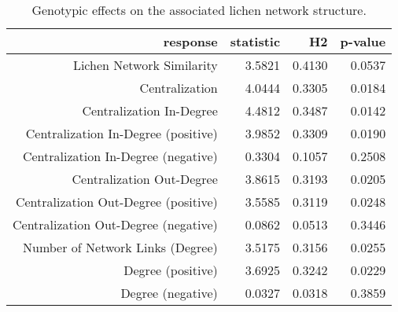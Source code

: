 \begin{table}[ht]
\centering
\begin{tabular}{rrrr}
  \hline
response & statistic & H2 & p-value \\ 
  \hline
Lichen Network Similarity & 3.5821 & 0.4130 & 0.0537 \\ 
  Centralization & 4.0444 & 0.3305 & 0.0184 \\ 
  Centralization In-Degree & 4.4812 & 0.3487 & 0.0142 \\ 
  Centralization In-Degree (positive) & 3.9852 & 0.3309 & 0.0190 \\ 
  Centralization In-Degree (negative) & 0.3304 & 0.1057 & 0.2508 \\ 
  Centralization Out-Degree & 3.8615 & 0.3193 & 0.0205 \\ 
  Centralization Out-Degree (positive) & 3.5585 & 0.3119 & 0.0248 \\ 
  Centralization Out-Degree (negative) & 0.0862 & 0.0513 & 0.3446 \\ 
  Number of Network Links (Degree) & 3.5175 & 0.3156 & 0.0255 \\ 
  Degree (positive) & 3.6925 & 0.3242 & 0.0229 \\ 
  Degree (negative) & 0.0327 & 0.0318 & 0.3859 \\ 
   \hline
\end{tabular}
\caption{Genotypic effects on the associated lichen network structure.} 
\label{tab:h2_net}
\end{table}
